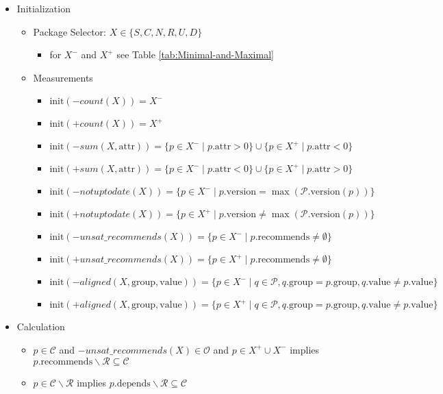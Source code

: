 \documentclass[a4paper,english]{article}
\begin{document}
\begin{itemize}
  \item Initialization
    \begin{itemize}
      \item Package Selector: $X\in\{S,C,N,R,U,D\}$
        \begin{itemize}
          \item for $X^{-}$ and $X^{+}$ see Table \ref{tab:Minimal-and-Maximal}
        \end{itemize}
      \item Measurements
        \begin{itemize}
          \item $\mathrm{init}({-}\mathit{count}(X))=X^{-}$
          \item $\mathrm{init}({+}\mathit{count}(X))=X^{+}$
          \item $\mathrm{init}({-}\mathit{sum}(X,\mathrm{attr}))=\{p\in X^{-}\mid p.\mathrm{attr}>0\}\cup\{p\in X^{+}\mid p.\mathrm{attr}<0\}$
          \item $\mathrm{init}({+}\mathit{sum}(X,\mathrm{attr}))=\{p\in X^{-}\mid p.\mathrm{attr}<0\}\cup\{p\in X^{+}\mid p.\mathrm{attr}>0\}$
          \item $\mathrm{init}({-}\mathit{notuptodate}(X))=\{p\in X^{-}\mid p.\mathrm{version}=\max(\mathcal{P}.\mathrm{version}(p))\}$
          \item $\mathrm{init}({+}\mathit{notuptodate}(X))=\{p\in X^{+}\mid p.\mathrm{version}\not=\max(\mathcal{P}.\mathrm{version}(p))\}$
          \item $\mathrm{init}({-}\mathit{unsat\_recommends}(X))=\{p\in X^{-}\mid p.\mathrm{recommends}\neq\emptyset\}$
          \item $\mathrm{init}({+}\mathit{unsat\_recommends}(X))=\{p\in X^{+}\mid p.\mathrm{recommends}\neq\emptyset\}$
          \item $\mathrm{init}({-}\mathit{aligned}(X,\mathrm{group},\mathrm{value}))=\{p\in X^{-}\mid q\in \mathcal{P}, q.\mathrm{group} = p.\mathrm{group}, q.\mathrm{value} \neq p.\mathrm{value}\}$
          \item $\mathrm{init}({+}\mathit{aligned}(X,\mathrm{group},\mathrm{value}))=\{p\in X^{+}\mid q\in \mathcal{P}, q.\mathrm{group} = p.\mathrm{group}, q.\mathrm{value} \neq p.\mathrm{value}\}$
        \end{itemize}
    \end{itemize}
  \item Calculation
    \begin{itemize}
      \item $p\in \mathcal{C}$ and ${-}\mathit{unsat\_recommends}(X)\in\mathcal{O}$ and $p \in X^{+}\cup X^{-}$ implies $p.\mathrm{recommends}\backslash\mathcal{R}\subseteq\mathcal{C}$
      \item $p\in \mathcal{C}\backslash\mathcal{R}$ implies $p.\mathrm{depends}\backslash\mathcal{R}\subseteq\mathcal{C}$
    \end{itemize}
\end{itemize}
\end{document}
